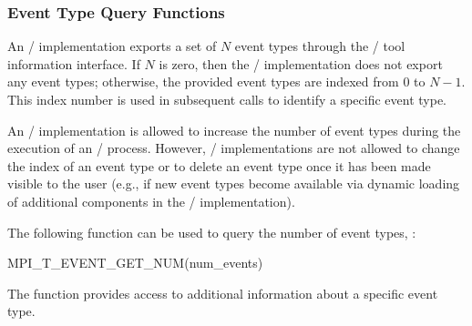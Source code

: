 \subsubsection{Event Type Query Functions}

An \MPI/ implementation exports a set of $N$ event types through the \MPI/
tool information interface. If $N$ is zero, then the \MPI/ implementation
does not export any event types; otherwise, the provided event types
are indexed from $0$ to $N-1$. This index number is used in subsequent
calls to identify a specific event type.

An \MPI/ implementation is allowed to increase the number of event types
during the execution of an \MPI/ process.
However, \MPI/ implementations are not
allowed to change the index of an event type or to delete an event type
once it has been made visible to the user (e.g., if new event types
become available via dynamic loading of additional components in the
\MPI/ implementation).

The following function can be used to query the number of event types, :

\begin{funcdef}{MPI\_T\_EVENT\_GET\_NUM}{(\mbox{num\_events})}
\end{funcdef}

The function  provides access to
additional information about a specific event type.


